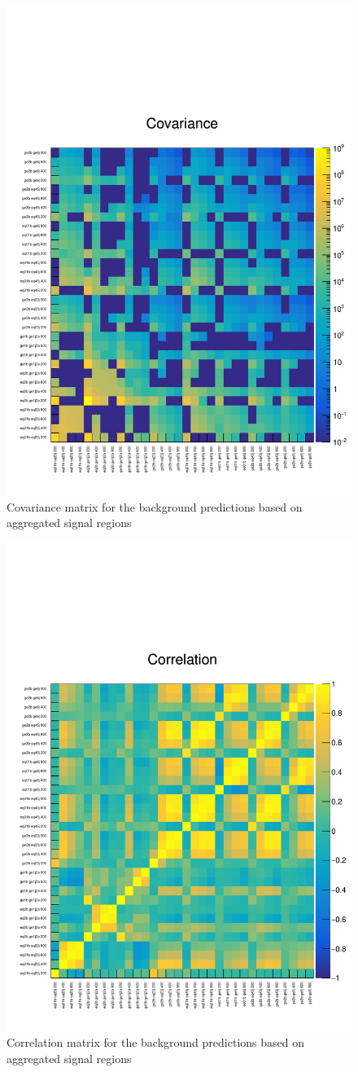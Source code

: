 \clearpage
\begin{figure}[h!]
  \centering
  \caption{Covariance matrix for the background
    predictions based on aggregated signal regions} 
  \label{fig:covarmatrix}
  \includegraphics[width=0.5\linewidth]{figures/results/36invfb_preapproval/aggregated/covariance}
\end{figure}

\begin{figure}[h!]
  \centering
  \caption{Correlation matrix for the background
    predictions based on aggregated signal regions} 
  \label{fig:corrmatrix}
  \includegraphics[width=0.5\linewidth]{figures/results/36invfb_preapproval/aggregated/correlation}
\end{figure}
